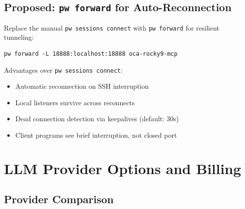 \documentclass[11pt,letterpaper,twoside]{article}
\begin{document}
\subsection{Proposed: \texttt{pw forward} for Auto-Reconnection}

Replace the manual \texttt{pw sessions connect} with \texttt{pw forward} for
resilient tunneling:

\begin{lstlisting}[style=bash]
pw forward -L 18888:localhost:18888 oca-rocky9-mcp
\end{lstlisting}

Advantages over \texttt{pw sessions connect}:
\begin{itemize}
\item Automatic reconnection on SSH interruption
\item Local listeners survive across reconnects
\item Dead connection detection via keepalives (default: 30s)
\item Client programs see brief interruption, not closed port
\end{itemize}

\section{LLM Provider Options and Billing}
\label{sec:providers}

\subsection{Provider Comparison}
\end{document}
